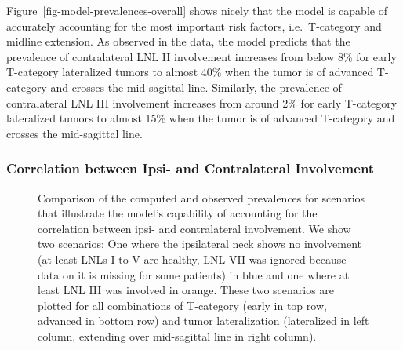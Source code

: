 \documentclass[
  sn-mathphys-num,
]{sn-jnl}
\begin{document}
Figure~\ref{fig-model-prevalences-overall} shows nicely that the model
is capable of accurately accounting for the most important risk factors,
i.e.~T-category and midline extension. As observed in the data, the
model predicts that the prevalence of contralateral LNL II involvement
increases from below 8\% for early T-category lateralized tumors to
almost 40\% when the tumor is of advanced T-category and crosses the
mid-sagittal line. Similarly, the prevalence of contralateral LNL III
involvement increases from around 2\% for early T-category lateralized
tumors to almost 15\% when the tumor is of advanced T-category and
crosses the mid-sagittal line.

\subsubsection{Correlation between Ipsi- and Contralateral
Involvement}\label{correlation-between-ipsi--and-contralateral-involvement}

\begin{figure}


\caption{\label{fig-model-prevalences-with-ipsi}Comparison of the
computed and observed prevalences for scenarios that illustrate the
model's capability of accounting for the correlation between ipsi- and
contralateral involvement. We show two scenarios: One where the
ipsilateral neck shows no involvement (at least LNLs I to V are healthy,
LNL VII was ignored because data on it is missing for some patients) in
blue and one where at least LNL III was involved in orange. These two
scenarios are plotted for all combinations of T-category (early in top
row, advanced in bottom row) and tumor lateralization (lateralized in
left column, extending over mid-sagittal line in right column).}

\end{figure}%
\end{document}
